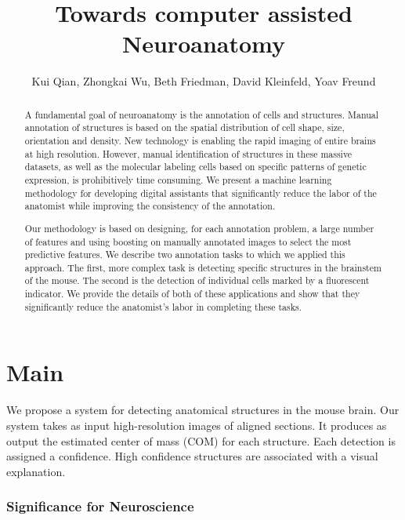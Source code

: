 \documentclass[11pt]{article}
\title{Towards computer assisted Neuroanatomy}
\author{Kui Qian, Zhongkai Wu, Beth Friedman, David Kleinfeld, Yoav Freund}
\begin{document}
\maketitle

\begin{abstract}
  A fundamental goal of neuroanatomy is the annotation of cells and
  structures.  Manual annotation of structures is based on the spatial
  distribution of cell shape, size, orientation and density.  New
  technology is enabling the rapid imaging of entire brains at high
  resolution. However, manual identification of structures in these massive datasets, as well as the molecular labeling cells based on
  specific patterns of genetic expression,  is prohibitively
  time consuming.  We present a machine
  learning methodology for developing digital assistants that
  significantly reduce the labor of the anatomist while improving the
  consistency of the annotation.

  Our methodology is based on designing, for each annotation problem,
  a large number of features and using boosting on manually annotated
  images to select the most predictive features. We describe two annotation tasks to which we applied this approach. The first, more complex task is detecting specific structures in the brainstem of the mouse. The second is the detection of individual cells marked by a fluorescent indicator. We provide the details of both of these applications and show that they significantly reduce the anatomist's labor in completing these tasks.
  
\end{abstract}

\section{Main}
We propose a system for detecting anatomical structures in the mouse
brain. Our system takes as input high-resolution images of aligned
sections. It produces as output the estimated center of mass (COM) for
each structure. Each detection is assigned a confidence. High
confidence structures are associated with a visual explanation.

\subsubsection {Significance for Neuroscience}
\end{document}
